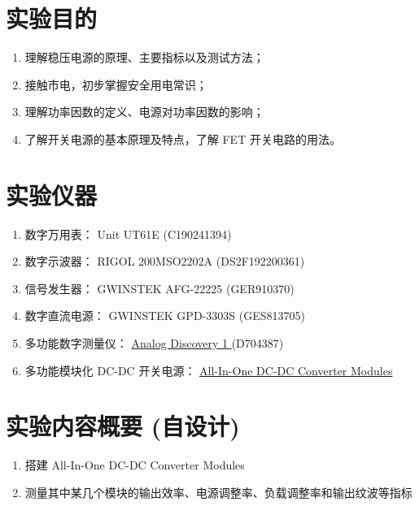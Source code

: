\documentclass[UTF8]{article}
\begin{document}
\section{实验目的}

\begin{enumerate}
\item 理解稳压电源的原理、主要指标以及测试方法；
\item 接触市电，初步掌握安全用电常识；
\item 理解功率因数的定义、电源对功率因数的影响；
\item 了解开关电源的基本原理及特点，了解 FET 开关电路的用法。
\end{enumerate}

\section{实验仪器}

\begin{enumerate}
    \item 数字万用表： Unit UT61E (C190241394)
    \item 数字示波器： RIGOL 200MSO2202A (DS2F192200361)
    \item 信号发生器： GWINSTEK AFG-22225 (GER910370)
    \item 数字直流电源： GWINSTEK GPD-3303S (GES813705) 
    \item 多功能数字测量仪： 
    \href{https://digilent.com/reference/test-and-measurement/analog-discovery/start
    }{ %
    Analog Discovery 1
    } 
    (D704387)
    \item 多功能模块化 DC-DC 开关电源：
    \href{https://yidingg.github.io/YiDingg/#/ElectronicDesigns/DC-DC\%20Converter\%20Modules
    }{ %
    All-In-One DC-DC Converter Modules
    }
\end{enumerate}

\section{实验内容概要 (自设计)}

\begin{enumerate}
\item 搭建 All-In-One DC-DC Converter Modules
\item 测量其中某几个模块的输出效率、电源调整率、负载调整率和输出纹波等指标
\end{enumerate}

\end{document}
